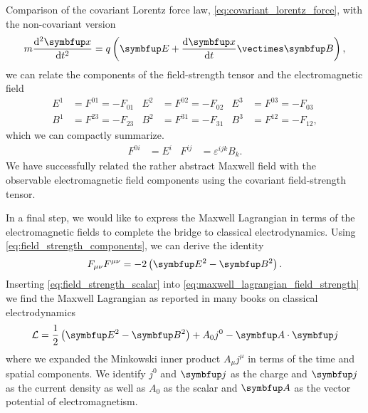 Comparison of the covariant Lorentz force law, \cref{eq:covariant_lorentz_force}, with the non-covariant version
\begin{equation}
	m
	\odv[order={2}]{\vb{x}}{t}
	=
	q\left(
		\vb{E}
		+
		\odv{\vb{x}}{t}
		\vcross
		\vb{B}
	\right)
	\label{eq:lorentz_force}
	,
\end{equation}
we can relate the components of the field-strength tensor and the electromagnetic field~\cite[p.~245]{Zee2013}
\begin{align}
	E^1
	&=
	F^{01}
	=
	-
	F_{01}
	&
	E^2
	&=
	F^{02}
	=
	-
	F_{02}
	&
	E^3
	&=
	F^{03}
	=
	-
	F_{03}
	\\
	B^1
	&=
	F^{23}
	=
	-
	F_{23}
	&
	B^2
	&=
	F^{31}
	=
	-
	F_{31}
	&
	B^3
	&=
	F^{12}
	=
	-
	F_{12}
	,
\end{align}
which we can compactly summarize.~\cite[p.~336]{Srednicki2007}
\begin{align}
	F^{0i}
	&=
	E^i
	&
	F^{ij}
	&=
	\varepsilon^{ijk}
	B_k
	\label{eq:field_strength_components}
	.
\end{align}
We have successfully related the rather abstract Maxwell field with the observable electromagnetic field components using the covariant field-strength tensor.

In a final step, we would like to express the Maxwell Lagrangian in terms of the electromagnetic fields to complete the bridge to classical electrodynamics.
Using \cref{eq:field_strength_components}, we can derive the identity~\cite[p.~142]{Greiner2013}
\begin{equation}
	F_{\mu\nu}
	F^{\mu\nu}
	=
	-2
	\left(
		\vb{E}^2
		-
		\vb{B}^2
	\right)
	\label{eq:field_strength_scalar}
	.
\end{equation}
Inserting \cref{eq:field_strength_scalar} into \cref{eq:maxwell_lagrangian_field_strength} we find the Maxwell Lagrangian as reported in many books on classical electrodynamics
\begin{equation}
	\mathcal{L}
	=
	\frac{1}{2}
	\left(
		\vb{E}^2
		-
		\vb{B}^2
	\right)
	+
	A_0j^0
	-
	\vb{A}
	\vdot
	\vb{j}
\end{equation}
where we expanded the Minkowski inner product $A_\mu j^\mu$ in terms of the time and spatial components.
We identify $j^0$ and $\vb{j}$ as the charge and $\vb{j}$ as the current density as well as $A_0$ as the scalar and $\vb{A}$ as the vector potential of electromagnetism.

